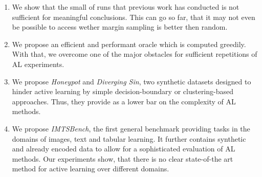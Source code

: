 \documentclass[]{article}
\begin{document}
\begin{enumerate}
\item We show that the small of runs that previous work has conducted is not
sufficient for meaningful conclusions. This can go so far, that it may not even
be possible to access wether margin sampling is better then random.
\item We propose an efficient and performant oracle which is computed greedily.
With that, we overcome one of the major obstacles for sufficient repetitions of
AL experiments. 
\item We propose \emph{Honeypot} and \emph{Diverging Sin}, two synthetic datasets
designed to hinder active learning by simple decision-boundary or
clustering-based approaches. Thus, they provide as a lower bar on the complexity
of AL methods.
\item We propose \emph{IMTSBench}, the first general benchmark providing tasks
in the domains of images, text and tabular learning. It further contains
synthetic and already encoded data to allow for a sophisticated evaluation of AL
methods. Our experiments show, that there is no clear state-of-the art method
for active learning over different domains.
\end{enumerate}

\end{document}
